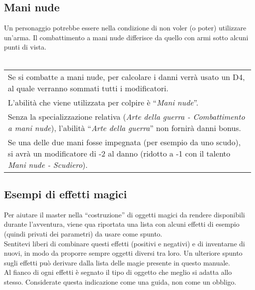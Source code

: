 \documentclass[../manuale_main.tex]{subfiles}
\begin{document}
\subsection{Mani nude}

Un personaggio potrebbe essere nella condizione di non voler (o poter) utilizzare un'arma. Il combattimento a mani nude differisce da quello con armi sotto alcuni punti di vista.\\\mbox{}\\
\renewcommand{\arraystretch}{1.5}
\begin{tabularx}{\linewidth}{|X|}
\hline
Se si combatte a mani nude, per calcolare i danni verrà usato un D4, al quale verranno sommati tutti i modificatori.\\
L'abilità che viene utilizzata per colpire è “\emph{Mani nude}”.\\
Senza la specializzazione relativa (\emph{Arte della guerra - Combattimento a mani nude}), l'abilità “\emph{Arte della guerra}” non fornirà danni bonus.\\
Se una delle due mani fosse impegnata (per esempio da uno scudo), si avrà un modificatore di -2 al danno (ridotto a -1 con il talento \emph{Mani nude - Scudiero}).\\
\hline
\end{tabularx}

\clearpage
\subsection{Esempi di effetti magici}

Per aiutare il master nella “costruzione” di oggetti magici da rendere disponibili durante l’avventura, viene qua riportata una lista con alcuni effetti di esempio (quindi privati dei parametri) da usare come spunto.\\
Sentitevi liberi di combinare questi effetti (positivi e negativi) e di inventarne di nuovi, in modo da proporre sempre oggetti diversi tra loro. Un ulteriore spunto sugli effetti può derivare dalla lista delle magie presente in questo manuale.\\
Al fianco di ogni effetti è segnato il tipo di oggetto che meglio si adatta allo stesso. Considerate questa indicazione come una guida, non come un obbligo.
\end{document}

